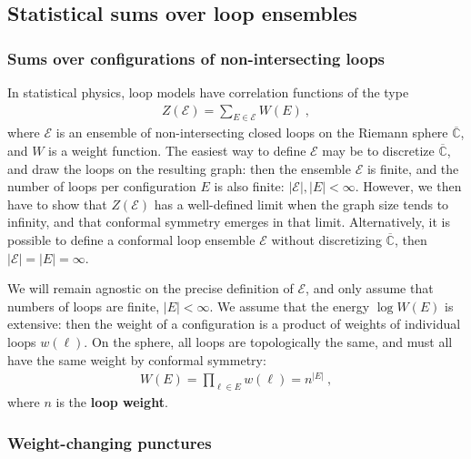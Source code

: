\documentclass[12pt, a4paper]{article}
\theoremstyle{break}
\begin{document}
\subsection{Statistical sums over loop ensembles}

\subsubsection{Sums over configurations of non-intersecting loops}

In statistical physics, loop models have correlation functions of the type
\begin{align}
 Z(\mathcal{E}) = \sum_{E\in\mathcal{E}} W(E)\ , 
\end{align}
where $\mathcal{E}$ is an ensemble of non-intersecting closed loops on the Riemann sphere $\overline{\mathbb{C}}$, and $W$ is a weight function. The easiest way to define $\mathcal{E}$ may be to discretize $\overline{\mathbb{C}}$, and draw the loops on the resulting graph: then the ensemble $\mathcal{E}$ is finite, and the number of loops per configuration $E$ is also finite: $|\mathcal{E}|, |E|<\infty$. 
However, we then have to show that $Z(\mathcal{E})$ has a well-defined limit when the graph size tends to infinity, and that conformal symmetry emerges in that limit. Alternatively, it is possible to define a conformal loop ensemble $\mathcal{E}$ without discretizing $\overline{\mathbb{C}}$, then $|\mathcal{E}|=|E|=\infty$. 
 
We will remain agnostic on the precise definition of $\mathcal{E}$, and only assume that numbers of loops are finite, $|E|<\infty$. We assume that the energy $\log W(E)$ is extensive: then the weight of a configuration is a product of weights of individual loops $w(\ell)$. On the sphere, all loops are topologically the same, and must all have the same weight by conformal symmetry: 
\begin{align}
 W(E) = \prod_{\ell \in E } w(\ell) = n^{|E|}\ ,
\end{align}
where $n$ is the \textbf{loop weight}. 


\subsubsection{Weight-changing punctures}
\end{document}
